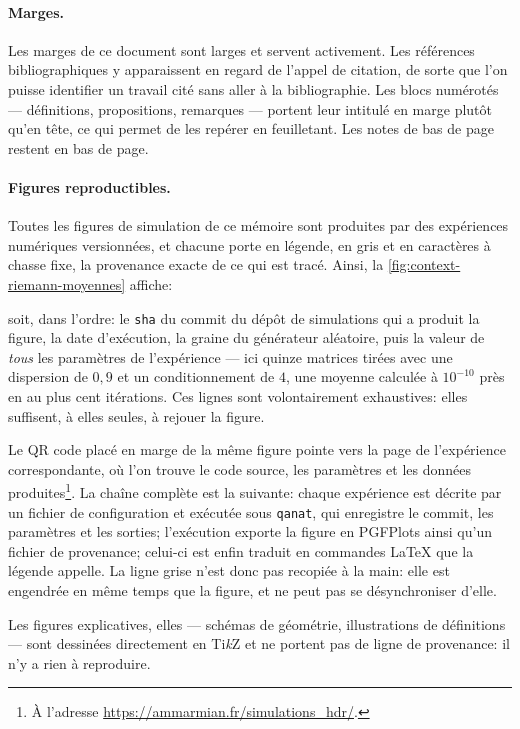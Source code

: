 \paragraph{Marges.} Les marges de ce document sont larges et servent
activement. Les références bibliographiques y apparaissent en regard de l'appel
de citation, de sorte que l'on puisse identifier un travail cité sans aller à la
bibliographie. Les blocs numérotés --- définitions, propositions, remarques ---
portent leur intitulé en marge plutôt qu'en tête, ce qui permet de les repérer
en feuilletant. Les notes de bas de page restent en bas de page.

\paragraph{Figures reproductibles.} Toutes les figures de simulation de ce
mémoire sont produites par des expériences numériques versionnées, et chacune
porte en légende, en gris et en caractères à chasse fixe, la provenance exacte
de ce qui est tracé. Ainsi, la \cref{fig:context-riemann-moyennes} affiche:
\begin{center}
  \provMoyennes
\end{center}
soit, dans l'ordre: le \texttt{sha} du commit du dépôt de simulations qui a
produit la figure, la date d'exécution, la graine du générateur aléatoire, puis
la valeur de \emph{tous} les paramètres de l'expérience --- ici quinze matrices
tirées avec une dispersion de $0{,}9$ et un conditionnement de $4$, une moyenne
calculée à $10^{-10}$ près en au plus cent itérations. Ces lignes sont
volontairement exhaustives: elles suffisent, à elles seules, à rejouer la
figure.

Le QR code placé en marge de la même figure pointe vers la page de l'expérience
correspondante, où l'on trouve le code source, les paramètres et les données
produites\footnote{À l'adresse
\url{https://ammarmian.fr/simulations_hdr/}.}. La chaîne complète est la
suivante: chaque expérience est décrite par un fichier de configuration et
exécutée sous \texttt{qanat}, qui enregistre le commit, les paramètres et les
sorties; l'exécution exporte la figure en PGFPlots ainsi qu'un fichier de
provenance; celui-ci est enfin traduit en commandes \LaTeX{} que la légende
appelle. La ligne grise n'est donc pas recopiée à la main: elle est engendrée en
même temps que la figure, et ne peut pas se désynchroniser d'elle.

Les figures explicatives, elles --- schémas de géométrie, illustrations de
définitions --- sont dessinées directement en Ti\emph{k}Z et ne portent pas de
ligne de provenance: il n'y a rien à reproduire.

